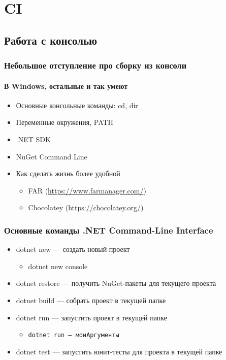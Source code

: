 \documentclass{../../slides-style}
\begin{document}
    \begin{frame}[plain]
        \titlepage
    \end{frame}

    \section{CI}

    \subsection{Работа с консолью}

    \begin{frame}
        \frametitle{Небольшое отступление про сборку из консоли}
        \framesubtitle{В Windows, остальные и так умеют}
        \begin{itemize}
            \item Основные консольные команды: cd, dir
            \item Переменные окружения, PATH
            \item .NET SDK
            \item NuGet Command Line
            \item Как сделать жизнь более удобной
            \begin{itemize}
                \item FAR (\url{https://www.farmanager.com/})
                \item Chocolatey (\url{https://chocolatey.org/})
            \end{itemize}
        \end{itemize}
    \end{frame}

    \begin{frame}
        \frametitle{Основные команды .NET Command-Line Interface}
        \begin{itemize}
            \item dotnet new --- создать новый проект
            \begin{itemize}
                \item dotnet new console
            \end{itemize}
            \item dotnet restore --- получить NuGet-пакеты для текущего проекта
            \item dotnet build --- собрать проект в текущей папке
            \item dotnet run --- запустить проект в текущей папке
            \begin{itemize}
                \item \texttt{dotnet run -- моиАргументы}
            \end{itemize}
            \item dotnet test --- запустить юнит-тесты для проекта в текущей папке
        \end{itemize}
    \end{frame}
\end{document}
